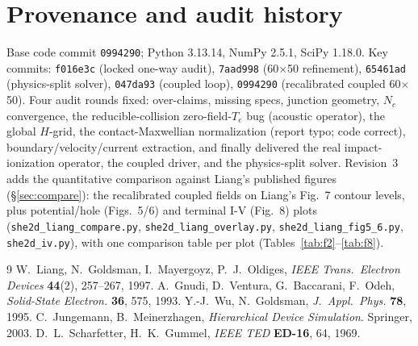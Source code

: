 \documentclass[11pt]{article}
\begin{document}
\section{Provenance and audit history}\label{sec:history}
Base code commit \texttt{0994290}; Python 3.13.14, NumPy 2.5.1, SciPy 1.18.0. Key commits:
\texttt{f016e3c} (locked one-way audit), \texttt{7aad998} (60$\times$50 refinement),
\texttt{65461ad} (physics-split solver), \texttt{047da93} (coupled loop), \texttt{0994290}
(recalibrated coupled 60$\times$50). Four audit rounds fixed:
over-claims, missing specs, junction geometry, $N_c$ convergence, the reducible-collision
zero-field-$T_e$ bug (acoustic operator), the global $H$-grid, the contact-Maxwellian
normalization (report typo; code correct), boundary/velocity/current extraction, and finally
delivered the real impact-ionization operator, the coupled driver, and the physics-split solver.
Revision~3 adds the quantitative comparison against Liang's published figures
(\S\ref{sec:compare}): the recalibrated coupled fields on Liang's Fig.~7 contour levels, plus
potential/hole (Figs.~5/6) and terminal I-V (Fig.~8) plots
(\texttt{she2d\_liang\_compare.py}, \texttt{she2d\_liang\_overlay.py},
\texttt{she2d\_liang\_fig5\_6.py}, \texttt{she2d\_iv.py}), with one comparison table per plot
(Tables~\ref{tab:f2}--\ref{tab:f8}).

\begin{thebibliography}{9}\small
{} W.~Liang, N.~Goldsman, I.~Mayergoyz, P.~J.~Oldiges, \emph{IEEE Trans.\ Electron
Devices} \textbf{44}(2), 257--267, 1997.
 A.~Gnudi, D.~Ventura, G.~Baccarani, F.~Odeh, \emph{Solid-State Electron.}
\textbf{36}, 575, 1993.
 Y.-J.~Wu, N.~Goldsman, \emph{J.\ Appl.\ Phys.} \textbf{78}, 1995.
 C.~Jungemann, B.~Meinerzhagen, \emph{Hierarchical Device Simulation}.
Springer, 2003.
 D.~L.~Scharfetter, H.~K.~Gummel, \emph{IEEE TED} \textbf{ED-16}, 64, 1969.
\end{thebibliography}
\end{document}
